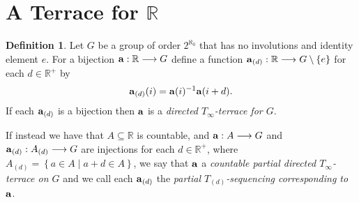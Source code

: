 \documentclass[11pt]{amsart}
\theoremstyle{definition}
\newtheorem*{definition}{Definition}
\theoremstyle{remark}
\newcommand{\R}{\mathbb{R}}
\newcommand{\st}{\; | \;}
\newcommand{\set}[2]{\left\{#1\st #2 \right\}}
\newcommand{\To}{\longrightarrow}
\renewcommand{\a}{\textup{\textbf{a}}}
\begin{document}
\section*{A Terrace for $\R$}
\begin{definition}
Let $G$ be a group of order $2^{\aleph_0}$ that has no involutions and identity element $e$. For a bijection $\a:\R \To G$ define a function $\a_{(d)}: \R \To G \setminus \{e\}$ for each $d \in \R^+$ by $$\a_{(d)}(i)=\a(i)^{-1}\a(i+d).$$ If each $\a_{(d)}$ is a bijection then $\a$ is a \emph{directed $T_\infty$-terrace for $G$}. 

If instead we have that $A \subseteq \R$ is countable, and $\a:A \To G$ and $\a_{(d)}:A_{(d)} \To G$ are injections for each $d \in \R^+$, where $A_{(d)}=\set{a \in A}{a+d \in A}$, we say that $\a$ a \emph{countable partial directed $T_\infty$-terrace on $G$} and we call each $\a_{(d)}$ the \emph{partial $T_{(d)}$-sequencing corresponding to $\a$}.
\end{definition}
\end{document}
